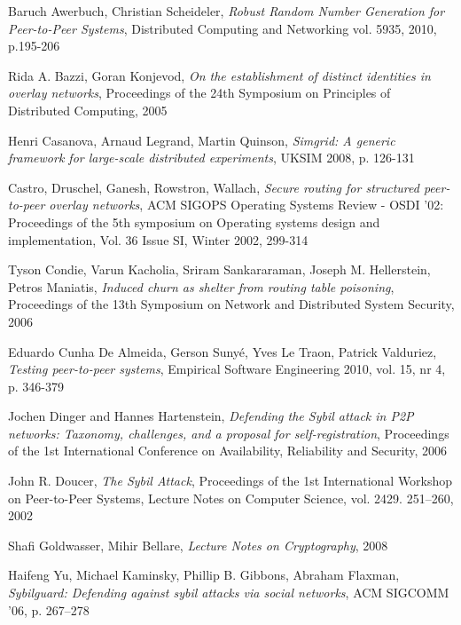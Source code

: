 \begin{thebibliography}{99}

  Baruch Awerbuch, Christian Scheideler,
  \textit{Robust Random Number Generation for Peer-to-Peer Systems},
  Distributed Computing and Networking vol. 5935, 2010, p.195-206

  Rida A. Bazzi, Goran Konjevod,
  \textit{On the establishment of distinct identities in overlay networks},
  Proceedings of the 24th Symposium on Principles of Distributed Computing,
  2005

  Henri Casanova, Arnaud Legrand, Martin Quinson,
  \textit{Simgrid: A generic framework for large-scale distributed experiments},
  UKSIM 2008, p. 126-131

 Castro, Druschel, Ganesh, Rowstron, Wallach,
  \textit{Secure routing for structured peer-to-peer overlay networks},
  ACM SIGOPS Operating Systems Review - OSDI '02: Proceedings of the 5th
  symposium on Operating systems design and implementation,
  Vol. 36 Issue SI, Winter 2002,
  299-314

  Tyson Condie, Varun Kacholia, Sriram Sankararaman, Joseph M. Hellerstein,
  Petros Maniatis,
  \textit{Induced churn as shelter from routing table poisoning},
  Proceedings of the 13th Symposium on Network and Distributed System Security,
  2006

  Eduardo Cunha De Almeida, Gerson Suny{\'e}, Yves Le Traon, Patrick Valduriez,
  \textit{Testing peer-to-peer systems},
  Empirical Software Engineering 2010, vol. 15, nr 4, p. 346-379
 
  Jochen Dinger and Hannes Hartenstein,
  \textit{Defending the Sybil attack in P2P networks: Taxonomy, challenges, and
  a proposal for self-registration},
  Proceedings of the 1st International Conference on Availability, Reliability
  and Security,
  2006

 John R. Doucer,
  \textit{The Sybil Attack},
  Proceedings of the 1st International Workshop on Peer-to-Peer Systems,
  Lecture Notes on Computer Science, vol.  2429. 251–260,
  2002

  Shafi Goldwasser, Mihir Bellare,
  \textit{Lecture Notes on Cryptography},
  2008


Haifeng Yu, Michael Kaminsky, Phillip B. Gibbons, Abraham Flaxman,
\textit{Sybilguard: Defending against sybil attacks via social networks},
ACM SIGCOMM ’06, p. 267--278


\end{thebibliography}
